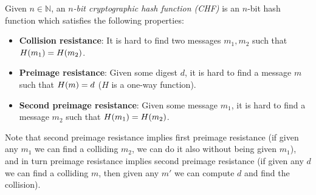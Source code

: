\begin{definition}
	Given \(n \in \mathbb{N}\), an \emph{\(n\)-bit cryptographic hash function (CHF)} is an \(n\)-bit 
  hash function which satisfies the following properties:
	\begin{itemize}
		\item \textbf{Collision resistance}: It is hard to find two messages \(m_1, m_2\) such
		      that \(\call{H}{m_1} = \call{H}{m_2}\).
		\item \textbf{Preimage resistance}: Given some digest \(d\), it is hard to find a
		      message \(m\) such that \(\call{H}{m} = d\) (\(H\) is a one-way function).
		\item \textbf{Second preimage resistance}: Given some message \(m_1\), it is hard to
		      find a message \(m_2\) such that \(\call{H}{m_1} = \call{H}{m_2}\).
	\end{itemize}
\end{definition}

Note that second preimage resistance implies first preimage resistance (if given any \(m_1\) 
we can find a colliding \(m_2\), we can do it also without being given \(m_1\)), and in turn 
preimage resistance implies second preimage resistance (if given any \(d\) we can find a colliding 
\(m\), then given any \(m'\) we can compute \(d\) and find the collision).

